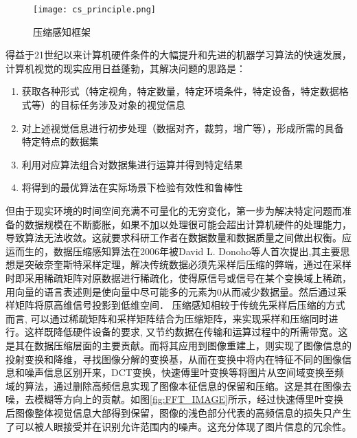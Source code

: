 \begin{figure}[ht]
  \centering
  \texttt{[image: cs\_principle.png]}
  \caption{压缩感知框架}
  
\end{figure}
得益于21世纪以来计算机硬件条件的大幅提升和先进的机器学习算法的快速发展，计算机视觉的现实应用日益蓬勃，其解决问题的思路是：
\begin{enumerate}
  \item 获取各种形式（特定视角，特定数量，特定环境条件，特定设备，特定数据格式等）的目标任务涉及对象的视觉信息
  \item 对上述视觉信息进行初步处理（数据对齐，裁剪，增广等），形成所需的具备特定特点的数据集
  \item 利用对应算法组合对数据集进行运算并得到特定结果
  \item 将得到的最优算法在实际场景下检验有效性和鲁棒性
\end{enumerate}


但由于现实环境的时间空间充满不可量化的无穷变化，第一步为解决特定问题而准备的数据规模在不断膨胀，如果不加以处理很可能会超出计算机硬件的处理能力，导致算法无法收敛。这就要求科研工作者在数据数量和数据质量之间做出权衡。应运而生的，数据压缩感知算法在2006年被David L. Donoho等人首次提出\citep{David_compress,An_Introduction_To_Compressive_Sampling,Extensions_of_compressed_sensing},其主要思想是突破奈奎斯特采样定理，解决传统数据必须先采样后压缩的弊端，通过在采样时即采用稀疏矩阵对原数据进行稀疏化，使得原信号或信号在某个变换域上稀疏，用向量的语言表述则是使向量中尽可能多的元素为0从而减少数据量。然后通过采样矩阵将原高维信号投影到低维空间． 压缩感知相较于传统先采样后压缩的方式而言, 可以通过稀疏矩阵和采样矩阵结合为压缩矩阵，来实现采样和压缩同时进行。这样既降低硬件设备的要求, 又节约数据在传输和运算过程中的所需带宽。这是其在数据压缩层面的主要贡献。而将其应用到图像重建上，则实现了图像信息的投射变换和降维，寻找图像分解的变换基，从而在变换中将内在特征不同的图像信息和噪声信息区别开来，DCT变换\cite{DCT}，快速傅里叶变换等将图片从空间域变换至频域的算法，通过删除高频信息实现了图像本征信息的保留和压缩。这是其在图像去噪，去模糊等方向上的贡献。如图\ref{fig:FFT_IMAGE}所示，经过快速傅里叶变换后图像整体视觉信息大部得到保留，图像的浅色部分代表的高频信息的损失只产生了可以被人眼接受并在识别允许范围内的噪声。这充分体现了图片信息的冗余性。


